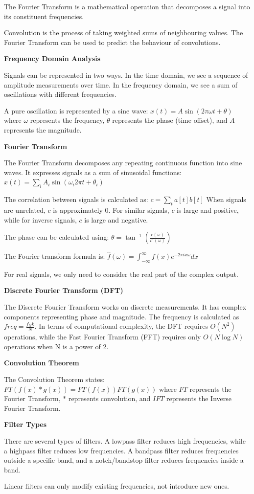 \documentclass{article}
\begin{document}
The Fourier Transform is a mathematical operation that decomposes a signal into its constituent frequencies.


Convolution is the process of taking weighted sums of neighbouring values.
The Fourier Transform can be used to predict the behaviour of convolutions.



\textbf{Frequency Domain Analysis}

Signals can be represented in two ways. In the time domain, we see a sequence of amplitude measurements over time. In the frequency domain, we see a sum of oscillations with different frequencies.

A pure oscillation is represented by a sine wave:
$x(t) = A\sin(2\pi\omega t + \theta)$
where $\omega$ represents the frequency, $\theta$ represents the phase (time offset), and $A$ represents the magnitude.

\textbf{Fourier Transform}

The Fourier Transform decomposes any repeating continuous function into sine waves. It expresses signals as a sum of sinusoidal functions:
$x(t) = \sum_i A_i\sin(\omega_i 2\pi t + \theta_i)$

The correlation between signals is calculated as:
$c = \sum_t a[t]b[t]$
When signals are unrelated, $c$ is approximately 0. For similar signals, $c$ is large and positive, while for inverse signals, $c$ is large and negative.

The phase can be calculated using:
$\theta = \tan^{-1}\left(\frac{c(\omega)}{c'(\omega)}\right)$

The Fourier transform formula is:
$\hat{f}(\omega) = \int_{-\infty}^{\infty} f(x)e^{-2\pi ix\omega}dx$

For real signals, we only need to consider the real part of the complex output.

\textbf{Discrete Fourier Transform (DFT)}

The Discrete Fourier Transform works on discrete measurements. It has complex components representing phase and magnitude. The frequency is calculated as $freq = \frac{f_N k}{N}$. In terms of computational complexity, the DFT requires $O(N^2)$ operations, while the Fast Fourier Transform (FFT) requires only $O(N\log N)$ operations when N is a power of 2.

\textbf{Convolution Theorem}

The Convolution Theorem states:
$FT(f(x) * g(x)) = FT(f(x))FT(g(x))$
where $FT$ represents the Fourier Transform, $*$ represents convolution, and $IFT$ represents the Inverse Fourier Transform.

\textbf{Filter Types}

There are several types of filters. A lowpass filter reduces high frequencies, while a highpass filter reduces low frequencies. A bandpass filter reduces frequencies outside a specific band, and a notch/bandstop filter reduces frequencies inside a band.

Linear filters can only modify existing frequencies, not introduce new ones.
\end{document}
